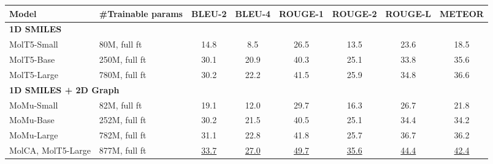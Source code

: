 \documentclass[11pt]{article}
\begin{document}
\begin{table*}[t]
    \centering
    \small
    \begin{subtable}[t]{\textwidth}
    \setlength{\tabcolsep}{4pt}
    \centering
    \small
    \begin{tabular}{llcccccc} \toprule
    Model                  & \#Trainable params       & BLEU-2               & BLEU-4               & ROUGE-1              & ROUGE-2              & ROUGE-L              & METEOR               \\\midrule
    \multicolumn{2}{l}{\textbf{1D SMILES}}            & \multicolumn{1}{l}{} & \multicolumn{1}{l}{} & \multicolumn{1}{l}{} & \multicolumn{1}{l}{} & \multicolumn{1}{l}{} & \multicolumn{1}{l}{} \\
    MolT5-Small            & 80M, full ft                      & 14.8                 & 8.5                  & 26.5                 & 13.5                 & 23.6                 & 18.5                 \\
    MolT5-Base             & 250M, full ft                     & 30.1                 & 20.9                 & 40.3                & 25.1                 & 33.8                 & 35.6                 \\
    MolT5-Large            & 780M, full ft                     & 30.2                 & 22.2                 & 41.5                & 25.9                 & 34.8                 & 36.6                 \\\midrule
    \multicolumn{2}{l}{\textbf{1D SMILES + 2D Graph}} &                      &                      &                      &                      &                      &                      \\
    MoMu-Small             & 82M, full ft                      & 19.1                 & 12.0                 & 29.7                 & 16.3                 & 26.7                 & 21.8                 \\
    MoMu-Base              & 252M, full ft                     & 30.2                 & 21.5                 & 40.5                 & 25.1                 & 34.4                 & 34.2                 \\
    MoMu-Large             & 782M, full ft                     & 31.1                 & 22.8                 & 41.8                 & 25.7                 & 36.7                 & 36.2                 \\
    MolCA, MolT5-Large & \multicolumn{1}{l}{877M, full ft} & \underline{33.7} & \underline{27.0} & \underline{49.7} & \underline{35.6} & \underline{44.4} & \underline{42.4} \\

\end{tabular}
\end{subtable}
\end{table*}
\end{document}
